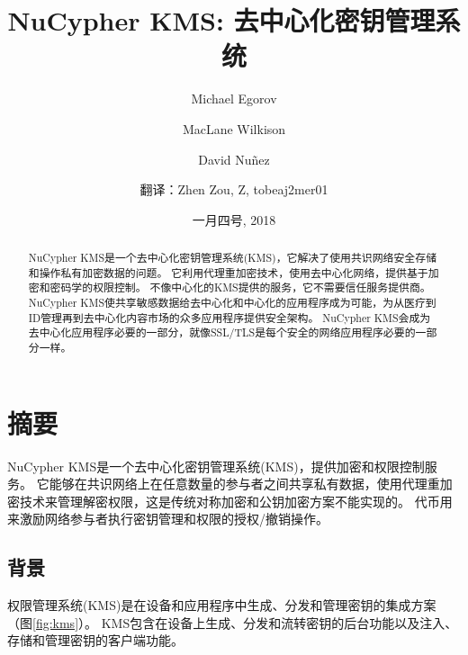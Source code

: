 \documentclass[longbibliography,nofootinbib]{revtex4-1}
\newcommand{\kms}{NuCypher KMS}
\begin{document}
\renewcommand{\tocname}{内容}
\renewcommand{\figurename}{图}
\newcommand{\figref}[1]{图\ref{#1}}

\title{\kms : 去中心化密钥管理系统}

\author{Michael Egorov}
\author{MacLane Wilkison}

\author{David Nu{\~n}ez}
\date{一月四号, 2018}

\author{翻译：Zhen Zou, Z, tobeaj2mer01}

\begin{abstract}
    \kms 是一个去中心化密钥管理系统(KMS)，它解决了使用共识网络安全存储和操作私有加密数据的问题\cite{cryptoeprint:2017:201}。
    它利用代理重加密技术，使用去中心化网络，提供基于加密和密码学的权限控制\cite{wiki:pre}。
    不像中心化的KMS提供的服务，它不需要信任服务提供商。
    \kms 使共享敏感数据给去中心化和中心化的应用程序成为可能，为从医疗到ID管理再到去中心化内容市场的众多应用程序提供安全架构。
    \kms 会成为去中心化应用程序必要的一部分，就像SSL/TLS是每个安全的网络应用程序必要的一部分一样。
\end{abstract}

\maketitle

\tableofcontents

\newpage

\section{摘要}

\kms 是一个去中心化密钥管理系统(KMS)，提供加密和权限控制服务。
它能够在共识网络上在任意数量的参与者之间共享私有数据，使用代理重加密技术来管理解密权限，这是传统对称加密和公钥加密方案不能实现的。
代币用来激励网络参与者执行密钥管理和权限的授权/撤销操作。

\subsection{背景}
权限管理系统(KMS)是在设备和应用程序中生成、分发和管理密钥的集成方案（\figref{fig:kms}）。
KMS包含在设备上生成、分发和流转密钥的后台功能以及注入、存储和管理密钥的客户端功能\cite{wiki:kms}。
\end{document}
